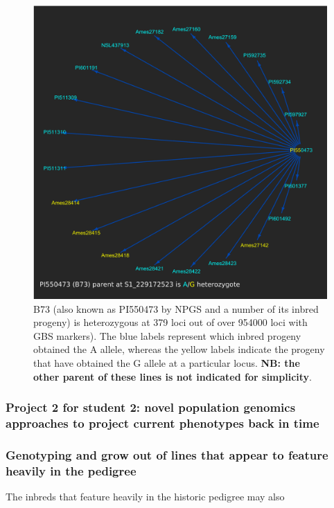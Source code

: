 \documentclass[12pt]{article}
\begin{document}
\begin{figure}[p]
\includegraphics[width=1.0\linewidth]{Pruned.pdf}
\caption{B73 (also known as PI550473 by NPGS and a number of its inbred progeny) is heterozygous at 379 loci out of over 954000 loci with GBS markers). The blue labels represent which inbred progeny obtained the A allele, whereas the yellow labels indicate the progeny that have obtained the G allele at a particular locus. \textbf{NB: the other parent of these lines is not indicated for simplicity}.}
\label{fig:alleledrop}
\end{figure}






\subsubsection*{Project 2 for student 2: novel population genomics approaches to project current phenotypes back in time}

\subsubsection*{Genotyping and grow out of lines that appear to feature heavily in the pedigree}
The inbreds that feature heavily in the historic pedigree may also  
\end{document}
